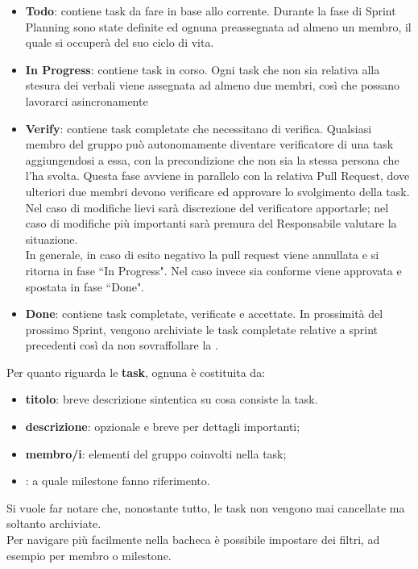 \begin{itemize}
    \item \textbf{Todo}: contiene task da fare in base allo  corrente. Durante la fase di Sprint Planning sono state definite ed ognuna preassegnata ad almeno un membro, il quale si occuperà del suo ciclo di vita.
  \item \textbf{In Progress}: contiene task in corso. Ogni task che non sia relativa alla stesura dei verbali viene assegnata ad almeno due membri, così che possano lavorarci asincronamente
  \item \textbf{Verify}: contiene task completate che necessitano di verifica. Qualsiasi membro del
      gruppo può autonomamente diventare verificatore di una task aggiungendosi a essa, con la
        precondizione che non sia la stessa persona che l'ha svolta. Questa fase avviene in
        parallelo con la relativa Pull Request, dove ulteriori due membri devono verificare ed
        approvare lo svolgimento della task. Nel caso di modifiche lievi sarà discrezione del
        verificatore apportarle; nel caso di modifiche più importanti sarà premura del Responsabile
        valutare la situazione.\\In generale, in caso di esito negativo la pull request viene
        annullata e si ritorna in fase ``In Progress". Nel caso invece sia conforme viene approvata
        e spostata in fase ``Done".
  \item \textbf{Done}: contiene task completate, verificate e accettate. In prossimità del prossimo
      Sprint, vengono archiviate le task completate relative a sprint precedenti così da non sovraffollare la .
\end{itemize}
\medskip
Per quanto riguarda le \textbf{task}, ognuna è costituita da:
\begin{itemize}
  \item \textbf{titolo}: breve descrizione sintentica su cosa consiste la task.
  \item \textbf{descrizione}: opzionale e breve per dettagli importanti;
  \item \textbf{membro/i}: elementi del gruppo coinvolti nella task;
  \item \textbf{}: a quale milestone fanno riferimento.
\end{itemize}
Si vuole far notare che, nonostante tutto, le task non vengono mai cancellate ma soltanto archiviate. \\Per navigare più facilmente nella bacheca è possibile impostare dei filtri, ad esempio per membro o milestone.
